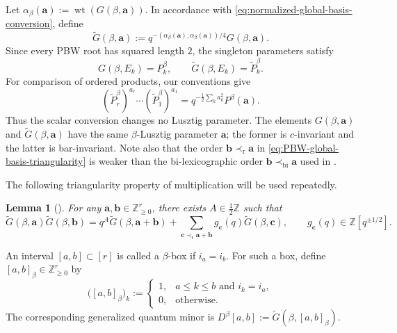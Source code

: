 \documentclass[12pt, reqno]{amsart}
\theoremstyle{plain}
\newtheorem{lemma}[theorem]{Lemma}
\theoremstyle{definition}
\numberwithin{equation}{section}
\newcommand{\ZZ}{\mathbb{Z}}
\DeclareMathOperator*{\wt}{wt}
\begin{document}
Let \(\alpha_\beta(\mathbf a):=\wt(G(\beta,\mathbf a))\). In
accordance with \eqref{eq:normalized-global-basis-conversion}, define
\begin{equation}\label{eq:normalized-PBW-global-basis-conversion}
    \widetilde G(\beta,\mathbf a)
    :=q^{-(\alpha_\beta(\mathbf a),
            \alpha_\beta(\mathbf a))/4}
      G(\beta,\mathbf a).
\end{equation}
Since every PBW root has squared length \(2\), the singleton
parameters satisfy
\begin{equation}\label{eq:singleton-PBW-normalization}
    G(\beta,E_k)=P_k^\beta,
    \qquad
    \widetilde G(\beta,E_k)=\widetilde P_k^\beta.
\end{equation}
For comparison of ordered products, our conventions give
\begin{equation}\label{eq:ordered-normalized-PBW-product}
    (\widetilde P_r^\beta)^{a_r}\cdots
    (\widetilde P_1^\beta)^{a_1}
    =q^{-\frac12\sum_k a_k^2}P^\beta(\mathbf a).
\end{equation}
Thus the scalar conversion changes no Lusztig parameter.
The elements \(G(\beta,\mathbf a)\) and
\(\widetilde G(\beta,\mathbf a)\) have the same
\(\beta\)-Lusztig parameter \(\mathbf a\); the former is
\(c\)-invariant and the latter is bar-invariant. Note also that the
order \(\mathbf b\prec_{\mathrm r}\mathbf a\) in
\eqref{eq:PBW-global-basis-triangularity} is weaker than the
bi-lexicographic order
\(\mathbf b\prec_{\operatorname{bi}}\mathbf a\) used in
\cite[Lemma~4.16]{kashiwara2024braid}.

The following triangularity property of multiplication will be used
repeatedly.

\begin{lemma}[{\cite[Lemma~4.9]{bi2026towards}}]
    \label{lem:global-basis-product-triangularity}
    For any \(\mathbf a,\mathbf b\in\ZZ_{\geq0}^r\), there exists
    \(A\in\frac12\ZZ\) such that
    \begin{equation}\label{eq:global-basis-product-triangularity}
        \widetilde G(\beta,\mathbf a)
        \widetilde G(\beta,\mathbf b)
        =q^A \widetilde G(\beta,\mathbf a+\mathbf b)
         +\sum_{\mathbf c\prec_{\mathrm r}\mathbf a+\mathbf b}
           g_{\mathbf c}(q)\widetilde G(\beta,\mathbf c),
        \qquad
        g_{\mathbf c}(q)\in\ZZ[q^{\pm1/2}].
    \end{equation}
\end{lemma}

An interval \([a,b]\subset[r]\) is called a \(\beta\)-box if
\(i_a=i_b\). For such a box, define
\([a,b]_\beta\in\ZZ_{\geq0}^r\) by
\begin{equation}\label{eq:beta-box-parameter}
    \bigl([a,b]_\beta\bigr)_k
    :=\begin{cases}
        1, & a\leq k\leq b\text{ and }i_k=i_a,\\
        0, & \text{otherwise}.
    \end{cases}
\end{equation}
The corresponding generalized quantum minor is
\(D^\beta[a,b]:=\widetilde G(\beta,[a,b]_\beta)\).
\end{document}
